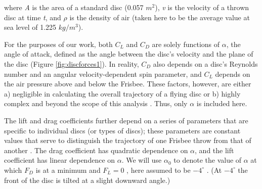 \documentclass[a4paper,12pt, oneside]{article}
\begin{document}
where \textit{A} is the area of a standard disc (0.057 $m^2$), \textit{v} is the velocity of a thrown disc at time \textit{t}, and $\rho$ is the density of air (taken here to be the average value at sea level of 1.225 $kg/m^3$)\cite{H3}. 

For the purposes of our work, both $C_L$ and $C_D$ are solely functions of $\alpha$, the angle of attack, defined as the angle between the disc's velocity and the plane of the disc (Figure \ref{fig:discforces1}). In reality, $C_D$ also depends on a disc's Reynolds number and an angular velocity-dependent spin parameter, and $C_L$ depends on the air pressure above and below the Frisbee. These factors, however, are either a) negligible in calculating the overall trajectory of a flying disc or b) highly complex and beyond the scope of this analysis \cite{H3}. Thus, only $\alpha$ is included here.

The lift and drag coefficients further depend on a series of parameters that are specific to individual discs (or types of discs); these parameters are constant values that serve to distinguish the trajectory of one Frisbee throw from that of another \cite{hubbardandhummel}.  The drag coefficient has quadratic dependence on $\alpha$, and the lift coefficient has linear dependence on $\alpha$. We will use $\alpha_0$ to denote the value of $\alpha$ at which $F_D$ is at a minimum and $F_L=0$ , here assumed to be $-4^{\circ}$ \cite{H3}. (At $-4^{\circ}$ the front of the disc is tilted at a slight downward angle.) 
\end{document}
